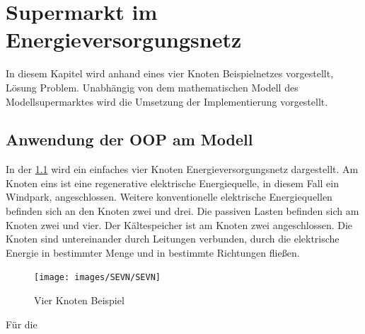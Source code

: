 \chapter{Supermarkt im Energieversorgungsnetz}
\label{chap:SEVN}
\minitoc

In diesem Kapitel wird anhand eines vier Knoten Beispielnetzes vorgestellt, Lösung Problem. Unabhängig von dem mathematischen Modell des Modellsupermarktes wird die Umsetzung der Implementierung
vorgestellt.



\section{Anwendung der OOP am Modell}
In der \cref{vkb} wird ein einfaches vier Knoten Energieversorgungsnetz dargestellt. Am Knoten eins ist eine regenerative
elektrische Energiequelle, in diesem Fall ein Windpark, angeschlossen. Weitere konventionelle elektrische Energiequellen
befinden sich an den Knoten zwei und drei. Die passiven Lasten befinden sich am Knoten zwei und vier. Der Kältespeicher ist am
Knoten zwei angeschlossen. Die Knoten sind untereinander durch Leitungen verbunden, durch die elektrische Energie in
bestimmter Menge und in bestimmte Richtungen fließen.

\begin{figure}[h]
\caption{Vier Knoten Beispiel}
	\label{vkb}
	\begin{center}
	\texttt{[image: images/SEVN/SEVN]}
	\end{center}
\end{figure}

Für die 

